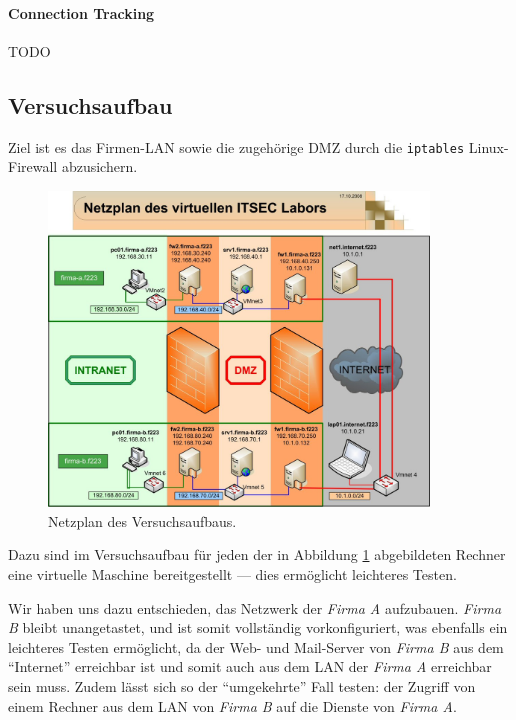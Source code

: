 \paragraph{Connection Tracking}
TODO


\subsection{Versuchsaufbau}\label{sec.aufbau}

Ziel ist es das Firmen-LAN sowie die zugehörige DMZ durch die
{\tt iptables} Linux-Firewall abzusichern.

\begin{figure}[h!]
  \centering
    \includegraphics[width=0.9\textwidth]{figures/Netzplan.jpg}
  \caption{Netzplan des Versuchsaufbaus.\cite{labor}}
  \label{fig.netzplan}
\end{figure}

Dazu sind im Versuchsaufbau für jeden der in Abbildung 
\ref{fig.netzplan} abgebildeten Rechner
eine virtuelle Maschine bereitgestellt --- dies ermöglicht leichteres
Testen.

Wir haben uns dazu entschieden, das Netzwerk der \emph{Firma A} aufzubauen.
\emph{Firma B} bleibt unangetastet, und ist somit vollständig vorkonfiguriert,
was ebenfalls ein leichteres Testen ermöglicht, da der Web- und Mail-Server von
\emph{Firma B} aus dem "`Internet"' erreichbar ist und somit auch aus dem LAN
der \emph{Firma A} erreichbar sein muss.
Zudem lässt sich so der "`umgekehrte"' Fall testen: der Zugriff von einem
Rechner aus dem LAN von \emph{Firma B} auf die Dienste von
\emph{Firma A}.\cite{labor}


